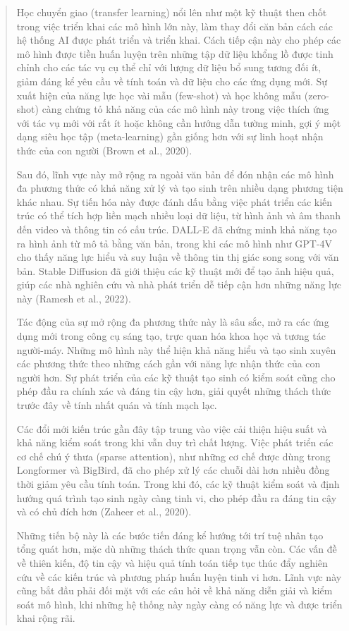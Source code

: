 \begin{quote}
Học chuyển giao (transfer learning) nổi lên như một kỹ thuật then chốt trong việc triển khai các mô hình lớn này, làm thay đổi căn bản cách các hệ thống AI được phát triển và triển khai. Cách tiếp cận này cho phép các mô hình được tiền huấn luyện trên những tập dữ liệu khổng lồ được tinh chỉnh cho các tác vụ cụ thể chỉ với lượng dữ liệu bổ sung tương đối ít, giảm đáng kể yêu cầu về tính toán và dữ liệu cho các ứng dụng mới. Sự xuất hiện của năng lực học vài mẫu (few-shot) và học không mẫu (zero-shot) càng chứng tỏ khả năng của các mô hình này trong việc thích ứng với tác vụ mới với rất ít hoặc không cần hướng dẫn tường minh, gợi ý một dạng siêu học tập (meta-learning) gần giống hơn với sự linh hoạt nhận thức của con người (Brown et al., 2020).

Sau đó, lĩnh vực này mở rộng ra ngoài văn bản để đón nhận các mô hình đa phương thức có khả năng xử lý và tạo sinh trên nhiều dạng phương tiện khác nhau. Sự tiến hóa này được đánh dấu bằng việc phát triển các kiến trúc có thể tích hợp liền mạch nhiều loại dữ liệu, từ hình ảnh và âm thanh đến video và thông tin có cấu trúc. DALL-E đã chứng minh khả năng tạo ra hình ảnh từ mô tả bằng văn bản, trong khi các mô hình như GPT-4V cho thấy năng lực hiểu và suy luận về thông tin thị giác song song với văn bản. Stable Diffusion đã giới thiệu các kỹ thuật mới để tạo ảnh hiệu quả, giúp các nhà nghiên cứu và nhà phát triển dễ tiếp cận hơn những năng lực này (Ramesh et al., 2022).

Tác động của sự mở rộng đa phương thức này là sâu sắc, mở ra các ứng dụng mới trong công cụ sáng tạo, trực quan hóa khoa học và tương tác người-máy. Những mô hình này thể hiện khả năng hiểu và tạo sinh xuyên các phương thức theo những cách gần với năng lực nhận thức của con người hơn. Sự phát triển của các kỹ thuật tạo sinh có kiểm soát cũng cho phép đầu ra chính xác và đáng tin cậy hơn, giải quyết những thách thức trước đây về tính nhất quán và tính mạch lạc.

Các đổi mới kiến trúc gần đây tập trung vào việc cải thiện hiệu suất và khả năng kiểm soát trong khi vẫn duy trì chất lượng. Việc phát triển các cơ chế chú ý thưa (sparse attention), như những cơ chế được dùng trong Longformer và BigBird, đã cho phép xử lý các chuỗi dài hơn nhiều đồng thời giảm yêu cầu tính toán. Trong khi đó, các kỹ thuật kiểm soát và định hướng quá trình tạo sinh ngày càng tinh vi, cho phép đầu ra đáng tin cậy và có chủ đích hơn (Zaheer et al., 2020).

Những tiến bộ này là các bước tiến đáng kể hướng tới trí tuệ nhân tạo tổng quát hơn, mặc dù những thách thức quan trọng vẫn còn. Các vấn đề về thiên kiến, độ tin cậy và hiệu quả tính toán tiếp tục thúc đẩy nghiên cứu về các kiến trúc và phương pháp huấn luyện tinh vi hơn. Lĩnh vực này cũng bắt đầu phải đối mặt với các câu hỏi về khả năng diễn giải và kiểm soát mô hình, khi những hệ thống này ngày càng có năng lực và được triển khai rộng rãi.


\end{quote}
